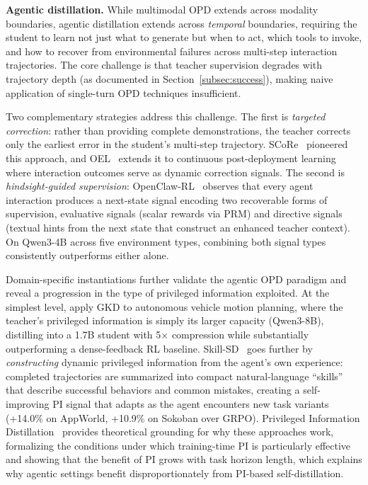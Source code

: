 \documentclass{article} %
\begin{document}
\textbf{Agentic distillation.}
While multimodal OPD extends across modality boundaries, agentic distillation extends across \emph{temporal} boundaries, requiring the student to learn not just what to generate but when to act, which tools to invoke, and how to recover from environmental failures across multi-step interaction trajectories. The core challenge is that teacher supervision degrades with trajectory depth (as documented in Section~\ref{subsec:success}), making naive application of single-turn OPD techniques insufficient.

Two complementary strategies address this challenge. The first is \emph{targeted correction}: rather than providing complete demonstrations, the teacher corrects only the earliest error in the student's multi-step trajectory. SCoRe~\citep{2509.14257} pioneered this approach, and OEL~\citep{2603.16856} extends it to continuous post-deployment learning where interaction outcomes serve as dynamic correction signals. The second is \emph{hindsight-guided supervision}: OpenClaw-RL~\citep{wang2026openclawrl} observes that every agent interaction produces a next-state signal encoding two recoverable forms of supervision, evaluative signals (scalar rewards via PRM) and directive signals (textual hints from the next state that construct an enhanced teacher context). On Qwen3-4B across five environment types, combining both signal types consistently outperforms either alone.

Domain-specific instantiations further validate the agentic OPD paradigm and reveal a progression in the type of privileged information exploited. At the simplest level, \citet{afsharrad2026onpolicy} apply GKD to autonomous vehicle motion planning, where the teacher's privileged information is simply its larger capacity (Qwen3-8B), distilling into a 1.7B student with 5$\times$ compression while substantially outperforming a dense-feedback RL baseline. Skill-SD~\citep{wang2026skillsd} goes further by \emph{constructing} dynamic privileged information from the agent's own experience: completed trajectories are summarized into compact natural-language ``skills'' that describe successful behaviors and common mistakes, creating a self-improving PI signal that adapts as the agent encounters new task variants (+14.0\% on AppWorld, +10.9\% on Sokoban over GRPO). Privileged Information Distillation~\citep{2602.04942} provides theoretical grounding for why these approaches work, formalizing the conditions under which training-time PI is particularly effective and showing that the benefit of PI grows with task horizon length, which explains why agentic settings benefit disproportionately from PI-based self-distillation.
\end{document}
